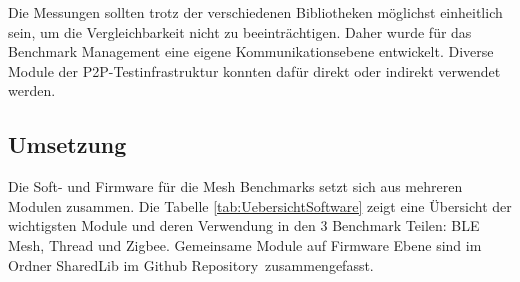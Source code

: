 \begin{table}[h]
\centering
{}
\caption{Eingesetzte SDK's für die Umsetzung der Benchmark Firmware}
\label{tab:Eingesetzte SDKs}
\end{table}

Die Messungen sollten trotz der verschiedenen Bibliotheken möglichst einheitlich sein, um die Vergleichbarkeit nicht zu beeinträchtigen.
Daher wurde für das Benchmark Management eine eigene Kommunikationsebene entwickelt.
Diverse Module der P2P-Testinfrastruktur konnten dafür direkt oder indirekt verwendet werden.

\subsection{Umsetzung}\label{subsec:Software_Umsetzung}
Die Soft- und Firmware für die Mesh Benchmarks setzt sich aus mehreren Modulen zusammen. Die Tabelle \ref{tab:UebersichtSoftware} zeigt eine Übersicht der wichtigsten Module und deren Verwendung in den 3 Benchmark Teilen: BLE Mesh, Thread und Zigbee.
Gemeinsame Module auf Firmware Ebene sind im Ordner SharedLib im Github Repository\footnotemark\ zusammengefasst.


